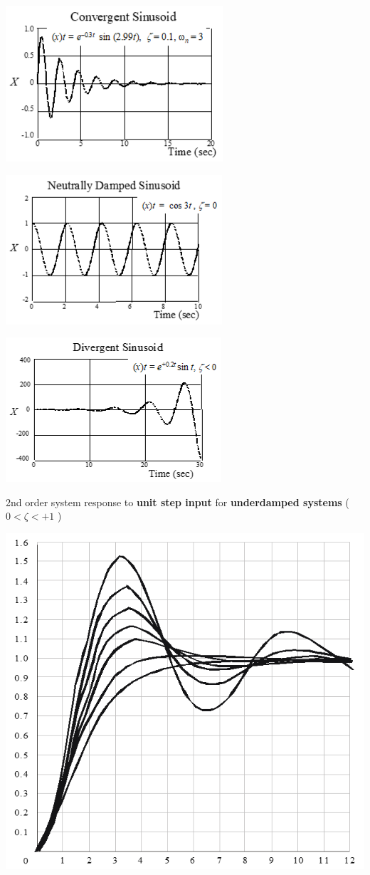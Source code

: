 \documentclass[
]{book}
\begin{document}
\includegraphics{media/08/image50.png}

\includegraphics{media/08/image51.png}

\includegraphics{media/08/image52.png}

2nd order system response to \textbf{unit step input} for \textbf{underdamped systems} ( \(0 < \zeta < +1\) )

\includegraphics{media/08/image53.png}
\end{document}
